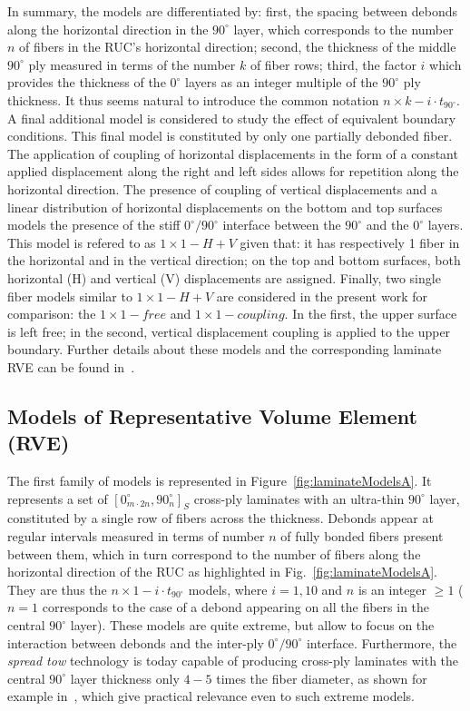 \documentclass[review]{elsarticle}
\begin{document}
In summary, the models are differentiated by: first, the spacing between debonds along the horizontal direction in the $90^{\circ}$ layer, which corresponds to the number $n$ of fibers in the RUC's horizontal direction; second, the thickness of the middle $90^{\circ}$ ply measured in terms of the number $k$ of fiber rows; third, the factor $i$ which provides the thickness of the $0^{\circ}$ layers as an integer multiple of the $90^{\circ}$ ply thickness.  It thus seems natural to introduce the common notation $n\times k-i\cdot t_{90^{\circ}}$. A final additional model is considered to study the effect of equivalent boundary conditions. This final model is constituted by only one partially debonded fiber. The application of coupling of horizontal displacements in the form of a constant applied displacement along the right and left sides allows for repetition along the horizontal direction. The presence of coupling of vertical displacements and a linear distribution of horizontal displacements on the bottom and top surfaces models the presence of the stiff $0^{\circ}/90^{\circ}$ interface between the $90^{\circ}$ and the $0^{\circ}$ layers. This model is refered to as $1\times 1-H+V$ given that: it has respectively 1 fiber in the horizontal and in the vertical direction; on the top and bottom surfaces, both horizontal (H) and vertical (V) displacements are assigned. Finally, two single fiber models similar to  $1\times 1-H+V$ are considered in the present work for comparison: the  $1\times 1-free$ and  $1\times 1-coupling$. In the first, the upper surface is left free; in the second, vertical displacement coupling is applied to the upper boundary. Further details about these models and the corresponding laminate RVE can be found in~\cite{DiStasio2019}.


\subsection{Models of Representative Volume Element (RVE)}\label{subsec:rve}

The first family of models is represented in Figure~\ref{fig:laminateModelsA}. It represents a set of $\left[0_{m\cdot2n}^{\circ},90_{n}^{\circ}\right]_{S}$ cross-ply laminates with an ultra-thin $90^{\circ}$ layer, constituted by a single row of fibers across the thickness. Debonds appear at regular intervals measured in terms of number $n$ of fully bonded fibers present between them, which in turn correspond to the number of fibers along the horizontal direction of the RUC as highlighted in Fig.~\ref{fig:laminateModelsA}. They are thus the $n\times1-i\cdot t_{90^{\circ}}$ models, where $i=1,10$ and $n$ is an integer $\geq1$ ($n=1$ corresponds to the case of a debond appearing on all the fibers in the central $90^{\circ}$ layer). These models are quite extreme, but allow to focus on the interaction between debonds and the inter-ply $0^{\circ}/90^{\circ}$ interface. Furthermore, the \emph{spread tow} technology is today capable of producing cross-ply laminates with the central $90^{\circ}$ layer thickness only $4-5$ times the fiber diameter, as shown for example in~\cite{Saito2012}, which give practical relevance even to such extreme models.
\end{document}
